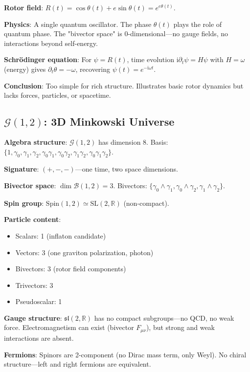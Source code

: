 \documentclass[11pt,a4paper]{article}
\numberwithin{equation}{section}
\theoremstyle{plain}
\theoremstyle{definition}
\theoremstyle{remark}
\newcommand{\R}{\mathbb{R}}
\newcommand{\Cl}{\mathcal{G}}               %
\newcommand{\Biv}{\mathcal{B}}             %
\newcommand{\Spin}{\mathrm{Spin}}
\newcommand{\ii}{\mathrm{i}}
\begin{document}
\textbf{Rotor field}: $R(t) = \cos\theta(t) + e\sin\theta(t) = e^{e\theta(t)}$.

\textbf{Physics}: A single quantum oscillator. The phase $\theta(t)$ plays the role of quantum phase. The "bivector space" is 0-dimensional—no gauge fields, no interactions beyond self-energy.

\textbf{Schrödinger equation}: For $\psi = R(t)$, time evolution $\ii \partial_t \psi = H\psi$ with $H = \omega$ (energy) gives $\partial_t\theta = -\omega$, recovering $\psi(t) = e^{-\ii\omega t}$.

\textbf{Conclusion}: Too simple for rich structure. Illustrates basic rotor dynamics but lacks forces, particles, or spacetime.

\subsection{$\Cl(1,2)$: 3D Minkowski Universe}

\textbf{Algebra structure}: $\Cl(1,2)$ has dimension 8. Basis: $\{1, \gamma_0, \gamma_1, \gamma_2, \gamma_0\gamma_1, \gamma_0\gamma_2, \gamma_1\gamma_2, \gamma_0\gamma_1\gamma_2\}$.

\textbf{Signature}: $(+,-,-)$—one time, two space dimensions.

\textbf{Bivector space}: $\dim \Biv(1,2) = 3$. Bivectors: $\{\gamma_0 \wedge \gamma_1, \gamma_0 \wedge \gamma_2, \gamma_1 \wedge \gamma_2\}$.

\textbf{Spin group}: $\Spin(1,2) \simeq \mathrm{SL}(2,\R)$ (non-compact).

\textbf{Particle content}:
\begin{itemize}
\item Scalars: 1 (inflaton candidate)
\item Vectors: 3 (one graviton polarization, photon)
\item Bivectors: 3 (rotor field components)
\item Trivectors: 3
\item Pseudoscalar: 1
\end{itemize}

\textbf{Gauge structure}: $\mathfrak{sl}(2,\R)$ has no compact subgroups—no QCD, no weak force. Electromagnetism can exist (bivector $F_{\mu\nu}$), but strong and weak interactions are absent.

\textbf{Fermions}: Spinors are 2-component (no Dirac mass term, only Weyl). No chiral structure—left and right fermions are equivalent.
\end{document}
